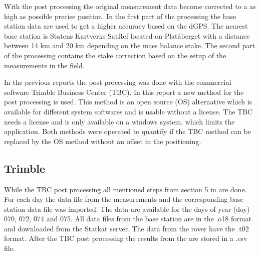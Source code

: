 
With the post processing the original measurement data become corrected to a as high as possible precise position.
In the first part of the processing the base station data are used to get a higher accuracy based on the dGPS.
The nearest base station is Statens Kartverks SatRef located on Platåberget with a distance between 14 km and 20 km depending on the mass balance stake.
The second part of the processing contains the stake correction based on the setup of the measurements in the field.
\medskip

In the previous reports the post processing was done with the commercial software Trimble Business Center (TBC). 
In this report a new method for the post processing is used. 
This method is an open source (OS) alternative which is available for different system softwares and is usable without a license. 
The TBC needs a license and is only available on a windows system, which limits the application. 
Both methods were operated to quantify if the TBC method can be replaced by the OS method without an offset in the positioning.

\subsection{Trimble}

While the TBC post processing all mentioned steps from section 5 in \cite{Trquickstart} are done.
For each day the data file from the measurements and the corresponding base station data file was imported. 
The data are available for the days of year (doy) 070, 072, 074 and 075.
All data files from the base station are in the .o18 format and downloaded from the Statkat server.
The data from the rover have the .t02 format. 
After the TBC post processing the results from the are stored in a .csv file.
\medskip

